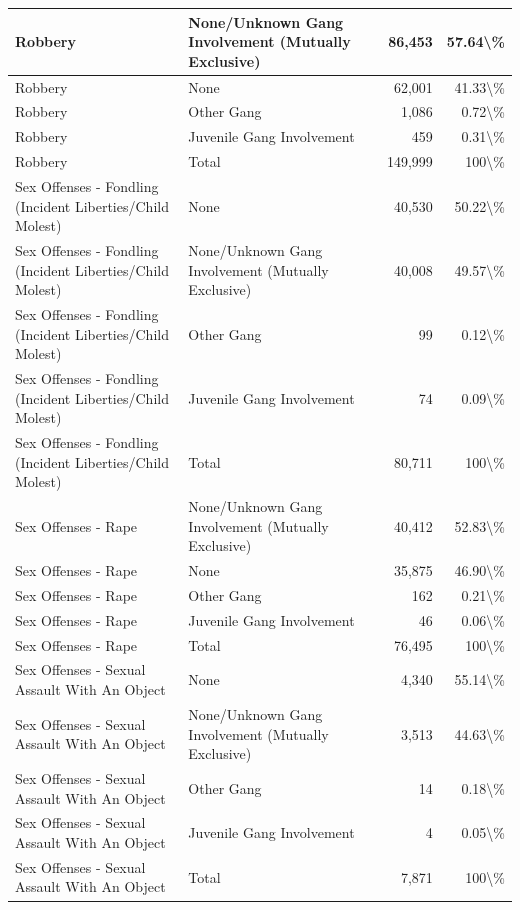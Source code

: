 \documentclass[
]{krantz}
\begin{document}
\begin{longtable}[t]{l|l|r|r}
\hline
Robbery & None/Unknown Gang Involvement (Mutually Exclusive) & 86,453 & 57.64\textbackslash{}\%\\
\hline
Robbery & None & 62,001 & 41.33\textbackslash{}\%\\
\hline
Robbery & Other Gang & 1,086 & 0.72\textbackslash{}\%\\
\hline
Robbery & Juvenile Gang Involvement & 459 & 0.31\textbackslash{}\%\\
\hline
Robbery & Total & 149,999 & 100\textbackslash{}\%\\
\hline
Sex Offenses - Fondling (Incident Liberties/Child Molest) & None & 40,530 & 50.22\textbackslash{}\%\\
\hline
Sex Offenses - Fondling (Incident Liberties/Child Molest) & None/Unknown Gang Involvement (Mutually Exclusive) & 40,008 & 49.57\textbackslash{}\%\\
\hline
Sex Offenses - Fondling (Incident Liberties/Child Molest) & Other Gang & 99 & 0.12\textbackslash{}\%\\
\hline
Sex Offenses - Fondling (Incident Liberties/Child Molest) & Juvenile Gang Involvement & 74 & 0.09\textbackslash{}\%\\
\hline
Sex Offenses - Fondling (Incident Liberties/Child Molest) & Total & 80,711 & 100\textbackslash{}\%\\
\hline
Sex Offenses - Rape & None/Unknown Gang Involvement (Mutually Exclusive) & 40,412 & 52.83\textbackslash{}\%\\
\hline
Sex Offenses - Rape & None & 35,875 & 46.90\textbackslash{}\%\\
\hline
Sex Offenses - Rape & Other Gang & 162 & 0.21\textbackslash{}\%\\
\hline
Sex Offenses - Rape & Juvenile Gang Involvement & 46 & 0.06\textbackslash{}\%\\
\hline
Sex Offenses - Rape & Total & 76,495 & 100\textbackslash{}\%\\
\hline
Sex Offenses - Sexual Assault With An Object & None & 4,340 & 55.14\textbackslash{}\%\\
\hline
Sex Offenses - Sexual Assault With An Object & None/Unknown Gang Involvement (Mutually Exclusive) & 3,513 & 44.63\textbackslash{}\%\\
\hline
Sex Offenses - Sexual Assault With An Object & Other Gang & 14 & 0.18\textbackslash{}\%\\
\hline
Sex Offenses - Sexual Assault With An Object & Juvenile Gang Involvement & 4 & 0.05\textbackslash{}\%\\
\hline
Sex Offenses - Sexual Assault With An Object & Total & 7,871 & 100\textbackslash{}\%\\

\end{longtable}
\end{document}
